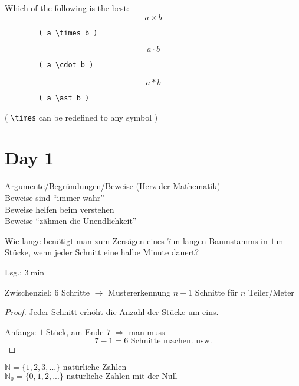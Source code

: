 \documentclass{myclass}
\begin{document}
\makemytitle



\begin{important}[TODO:]
	Which of the following is the best:
	\[ a \times b \]
	\begin{verbatim}
		( a \times b )
	\end{verbatim}
	\vspace{0.5cm}
	\[ a \cdot b \]
	\begin{verbatim}
		( a \cdot b )
	\end{verbatim}
	\vspace{0.5cm}
	\[ a \ast b \]
	\begin{verbatim}
		( a \ast b )
	\end{verbatim}
	\vspace{0.5cm}
	( \verb|\times| can be redefined to any symbol )
\end{important}

\section{Day 1}
Argumente/Begründungen/Beweise (Herz der Mathematik)\\
Beweise sind ``immer wahr''\\
Beweise helfen beim verstehen\\
Beweise ``zähmen die Unendlichkeit''\par

\begin{problem}
	Wie lange benötigt man zum Zersägen eines $\qty{7}{\meter}$-langen Baumstamms in $\qty{1}{\meter}$-Stücke, wenn jeder Schnitt eine halbe Minute dauert?\par
	Lsg.: $\qty{3}{\minute}$\par
	Zwischenziel: 6 Schritte $\rightarrow$ Mustererkennung $n-1$ Schnitte für $n$ Teiler/Meter\par
	\begin{proof}
		Jeder Schnitt erhöht die Anzahl der Stücke um eins.\par
		Anfangs: $1$ Stück, am Ende $7$ $\Rightarrow$ man muss \[7 - 1 = 6 \text{ Schnitte machen. usw.}\]
	\end{proof}
\end{problem}

$\mathbb{N} = \{1, 2, 3, ...\} \text{ natürliche Zahlen}$\\
$\mathbb{N}_0 = \{0, 1, 2, ...\} \text{ natürliche Zahlen mit der Null}$\par
\end{document}
